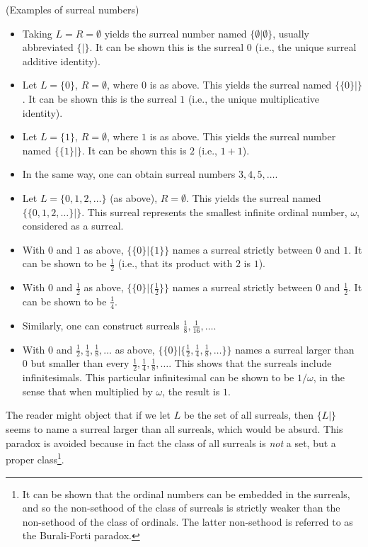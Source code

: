 \documentclass[twoside,11pt]{article}
\begin{document}
\begin{example}
    (Examples of surreal numbers)
    \begin{itemize}
        \item
        Taking $L=R=\emptyset$ yields the surreal number named $\{\emptyset|\emptyset\}$,
        usually abbreviated $\{|\}$. It can be shown this is the
        surreal $0$ (i.e., the unique surreal additive identity).
        \item
        Let $L=\{0\}$, $R=\emptyset$, where $0$ is as above.
        This yields the surreal named $\{\{0\}|\}$.
        It can be shown this is the surreal $1$ (i.e.,
        the unique multiplicative identity).
        \item
        Let $L=\{1\}$, $R=\emptyset$, where $1$ is as above. This yields the surreal
        number named $\{\{1\}|\}$. It can be shown this is $2$ (i.e., $1+1$).
        \item
        In the same way, one can obtain surreal numbers $3,4,5,\ldots$.
        \item
        Let $L=\{0,1,2,\ldots\}$ (as above), $R=\emptyset$. This yields the surreal
        named $\{\{0,1,2,\ldots\}|\}$. This surreal
        represents the smallest infinite ordinal number, $\omega$, considered as a surreal.
        \item
        With $0$ and $1$ as above, $\{\{0\}|\{1\}\}$ names a surreal strictly between $0$ and
        $1$. It can be shown to be $\frac12$
        (i.e., that its product with $2$ is $1$).
        \item
        With $0$ and $\frac12$ as above, $\{\{0\}|\{\frac12\}\}$ names a surreal strictly
        between $0$ and $\frac12$. It can be shown to be $\frac14$.
        \item
        Similarly, one can construct surreals $\frac18,\frac1{16},\ldots$.
        \item
        With $0$ and $\frac12,\frac14,\frac18,\ldots$ as above,
        $\{\{0\}|\{\frac12,\frac14,\frac18,\ldots\}\}$ names a surreal larger than $0$
        but smaller than every $\frac12,\frac14,\frac18,\ldots$. This shows that the
        surreals include infinitesimals. This particular infinitesimal can be shown
        to be $1/\omega$, in the sense that when multiplied by $\omega$, the result is $1$.
    \end{itemize}
\end{example}

The reader might object that if we let $L$ be the set of all surreals, then
$\{L|\}$ seems to name a surreal larger than all surreals,
which would be absurd. This paradox is avoided because in fact the class
of all surreals is \emph{not} a set, but a proper class\footnote{It can be shown
that the ordinal numbers can be embedded in the surreals, and so the non-sethood
of the class of surreals is strictly weaker than the non-sethood of the class of
ordinals. The latter non-sethood is referred to as the Burali-Forti paradox.}.
\end{document}
